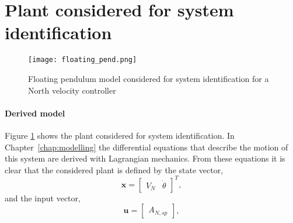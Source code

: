 \section{Plant considered for system identification} \label{sec:plant_considered}
    \begin{figure}[h]
        \centering
        \texttt{[image: floating\_pend.png]}            
        \caption{Floating pendulum model considered for system identification for a North velocity controller}
        \label{fig:floating_pend}
    \end{figure}

    \paragraph{Derived model}
    Figure \ref{fig:floating_pend} shows the plant considered for system identification.
    In Chapter~\ref{chap:modelling} the differential equations that describe the motion of this system are derived with Lagrangian mechanics.
    From these equations it is clear that the considered plant is defined by the state vector,
    \begin{equation}
        \bm{x} = \begin{bmatrix}
            V_N & \dot{\theta}
        \end{bmatrix}^T,
    \end{equation}
    and the input vector,
    \begin{equation}
        \bm{u} = \begin{bmatrix}
            A_{N,sp}
        \end{bmatrix},
    \end{equation}


